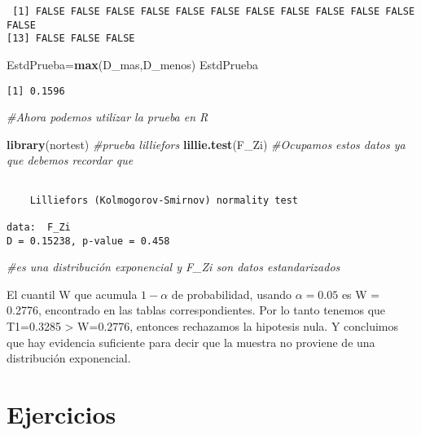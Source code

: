 \documentclass[a4paper,oneside,openany]{book}
\newenvironment{Shaded}{\begin{snugshade}}{\end{snugshade}}
\newcommand{\KeywordTok}[1]{\textcolor[rgb]{0.13,0.29,0.53}{\textbf{#1}}}
\newcommand{\CommentTok}[1]{\textcolor[rgb]{0.56,0.35,0.01}{\textit{#1}}}
\newcommand{\NormalTok}[1]{#1}
\begin{document}
\begin{verbatim}
 [1] FALSE FALSE FALSE FALSE FALSE FALSE FALSE FALSE FALSE FALSE FALSE FALSE
[13] FALSE FALSE FALSE
\end{verbatim}

\begin{Shaded}
\begin{Highlighting}[]
\NormalTok{EstdPrueba=}\KeywordTok{max}\NormalTok{(D_mas,D_menos)}
\NormalTok{EstdPrueba}
\end{Highlighting}
\end{Shaded}

\begin{verbatim}
[1] 0.1596
\end{verbatim}

\begin{Shaded}
\begin{Highlighting}[]
\CommentTok{#Ahora podemos utilizar la prueba en R}

\KeywordTok{library}\NormalTok{(nortest) }\CommentTok{#prueba lilliefors}
\KeywordTok{lillie.test}\NormalTok{(F_Zi) }\CommentTok{#Ocupamos estos datos ya que debemos recordar que }
\end{Highlighting}
\end{Shaded}

\begin{verbatim}

    Lilliefors (Kolmogorov-Smirnov) normality test

data:  F_Zi
D = 0.15238, p-value = 0.458
\end{verbatim}

\begin{Shaded}
\begin{Highlighting}[]
                   \CommentTok{#es una distribución exponencial y F_Zi son datos estandarizados }
\end{Highlighting}
\end{Shaded}

El cuantil W que acumula \(1-\alpha\) de probabilidad, usando
\(\alpha=0.05\) es W = 0.2776, encontrado en las tablas
correspondientes. Por lo tanto tenemos que T1=0.3285 \textgreater{}
W=0.2776, entonces rechazamos la hipotesis nula. Y concluimos que hay
evidencia suficiente para decir que la muestra no proviene de una
distribución exponencial.

\section{Ejercicios}\label{ejercicios-17}
\end{document}
